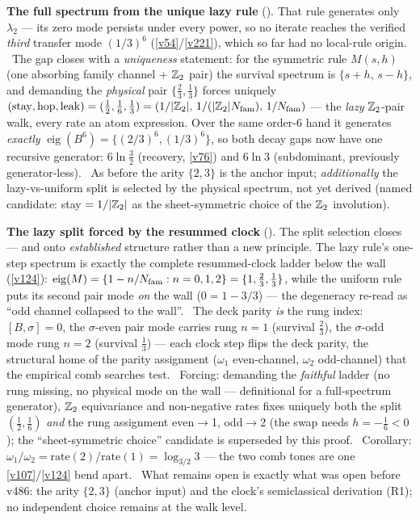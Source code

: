 \par\smallskip\noindent\textbf{The full spectrum from the unique lazy rule}
(). That rule generates only $\lambda_2$ --- its zero mode persists under
every power, so no iterate reaches the verified \emph{third} transfer mode $(1/3)^6$ (\vref{v54}/\vref{v221}),
which so far had no local-rule origin. \mE\ The gap closes with a \emph{uniqueness} statement: for the symmetric
rule $M(s,h)$ (one absorbing family channel $+$ $\mathbb Z_2$ pair) the survival spectrum is $\{s{+}h,\,s{-}h\}$, and
demanding the \emph{physical} pair $\{\tfrac23,\tfrac13\}$ forces uniquely
$(\mathrm{stay},\mathrm{hop},\mathrm{leak})=(\tfrac12,\tfrac16,\tfrac13)=(1/|\mathbb Z_2|,\,1/(|\mathbb Z_2|N_{\mathrm{fam}}),\,1/N_{\mathrm{fam}})$
--- the \emph{lazy} $\mathbb Z_2$-pair walk, every rate an atom expression. Over the same order-$6$ hand it generates
\emph{exactly} $\operatorname{eig}(B^6)=\{(2/3)^6,(1/3)^6\}$, so both decay gaps now have one recursive
generator: $6\ln\tfrac32$ (recovery, \vref{v76}) and $6\ln3$ (subdominant, previously generator-less). \mO\ As
before the arity $\{2,3\}$ is the anchor input; \emph{additionally} the lazy-vs-uniform split is selected by the
physical spectrum, not yet derived (named candidate: stay $=1/|\mathbb Z_2|$ as the sheet-symmetric choice of the
$\mathbb Z_2$ involution).

\par\smallskip\noindent\textbf{The lazy split forced by the resummed clock}
(). The split selection closes --- and onto \emph{established} structure
rather than a new principle. The lazy rule's one-step spectrum is exactly the complete resummed-clock ladder
below the wall (\vref{v124}): $\operatorname{eig}(M)=\{1-n/N_{\mathrm{fam}}:n=0,1,2\}=\{1,\tfrac23,\tfrac13\}$, while the
uniform rule puts its second pair mode \emph{on} the wall ($0=1-3/3$) --- the degeneracy re-read as ``odd channel
collapsed to the wall''. \mE\ The deck parity \emph{is} the rung index: $[B,\sigma]=0$, the $\sigma$-even pair
mode carries rung $n{=}1$ (survival $\tfrac23$), the $\sigma$-odd mode rung $n{=}2$ (survival $\tfrac13$) ---
each clock step flips the deck parity, the structural home of the parity assignment ($\omega_1$ even-channel,
$\omega_2$ odd-channel) that the empirical comb searches test. \mE\ Forcing: demanding the \emph{faithful} ladder
(no rung missing, no physical mode on the wall --- definitional for a full-spectrum generator), $\mathbb Z_2$
equivariance and non-negative rates fixes uniquely both the split $(\tfrac12,\tfrac16)$ \emph{and} the rung
assignment even${}\to{}$1, odd${}\to{}$2 (the swap needs $h=-\tfrac16<0$); the ``sheet-symmetric choice''
candidate is superseded by this proof. \mE\ Corollary: $\omega_1/\omega_2=\mathrm{rate}(2)/\mathrm{rate}(1)
=\log_{3/2}3$ --- the two comb tones are one \vref{v107}/\vref{v124} bend apart. \mO\ What remains open is
exactly what was open before v486: the arity $\{2,3\}$ (anchor input) and the clock's semiclassical derivation
(R1); no independent choice remains at the walk level.

